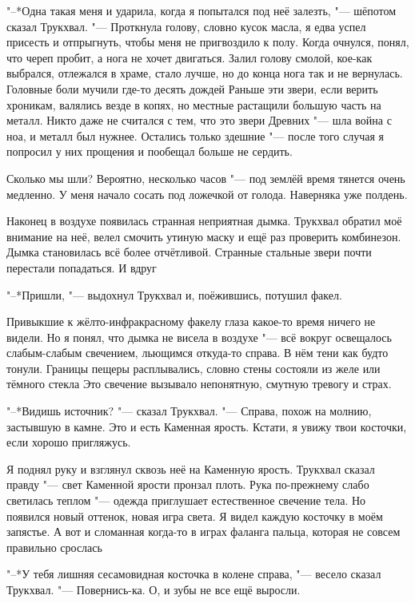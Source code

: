 "--*Одна такая меня и ударила, когда я попытался под неё залезть, "--- шёпотом сказал Трукхвал.
"--- Проткнула голову, словно кусок масла, я едва успел присесть и отпрыгнуть, чтобы меня не пригвоздило к полу.
Когда очнулся, понял, что череп пробит, а нога не хочет двигаться.
Залил голову смолой, кое-как выбрался, отлежался в храме, стало лучше, но до конца нога так и не вернулась.
Головные боли мучили где-то десять дождей\ldotst
Раньше эти звери, если верить хроникам, валялись везде в копях, но местные растащили большую часть на металл.
Никто даже не считался с тем, что это звери Древних "--- шла война с ноа, и металл был нужнее.
Остались только здешние "--- после того случая я попросил у них прощения и пообещал больше не сердить.

\ldotst Сколько мы шли?
Вероятно, несколько часов "--- под землёй время тянется очень медленно.
У меня начало сосать под ложечкой от голода.
Наверняка уже полдень.

Наконец в воздухе появилась странная неприятная дымка.
Трукхвал обратил моё внимание на неё, велел смочить утиную маску и ещё раз проверить комбинезон.
Дымка становилась всё более отчётливой.
Странные стальные звери почти перестали попадаться.
И вдруг\ldotst

"--*Пришли, "--- выдохнул Трукхвал и, поёжившись, потушил факел.

Привыкшие к жёлто-инфракрасному факелу глаза какое-то время ничего не видели.
Но я понял, что дымка не висела в воздухе "--- всё вокруг освещалось слабым-слабым свечением, льющимся откуда-то справа.
В нём тени как будто тонули.
Границы пещеры расплывались, словно стены состояли из желе или тёмного стекла\ldotst
Это свечение вызывало непонятную, смутную тревогу и страх.

"--*Видишь источник? "--- сказал Трукхвал.
"--- Справа, похож на молнию, застывшую в камне.
Это и есть Каменная ярость.
Кстати, я увижу твои косточки, если хорошо пригляжусь.

Я поднял руку и взглянул сквозь неё на Каменную ярость.
Трукхвал сказал правду "--- свет Каменной ярости пронзал плоть.
Рука по-прежнему слабо светилась теплом "--- одежда приглушает естественное свечение тела.
Но появился новый оттенок, новая игра света.
Я видел каждую косточку в моём запястье.
А вот и сломанная когда-то в играх фаланга пальца, которая не совсем правильно срослась\ldotst

"--*У тебя лишняя сесамовидная косточка в колене справа, "--- весело сказал Трукхвал.
"--- Повернись-ка.
О, и зубы не все ещё выросли.


